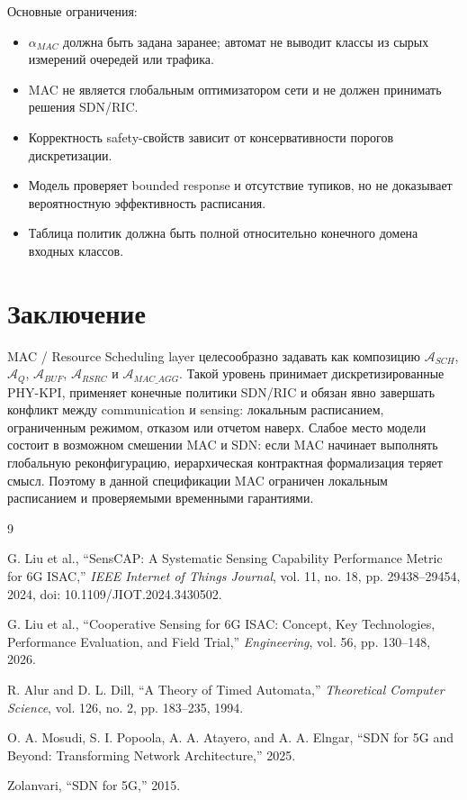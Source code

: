 \documentclass[10pt,a4paper]{article}
\newcommand{\A}[1]{\mathcal{A}_{#1}}
\begin{document}
Основные ограничения:
\begin{itemize}
  \item \(\alpha_{MAC}\) должна быть задана заранее; автомат не выводит классы из сырых измерений очередей или трафика.
  \item MAC не является глобальным оптимизатором сети и не должен принимать решения SDN/RIC.
  \item Корректность safety-свойств зависит от консервативности порогов дискретизации.
  \item Модель проверяет bounded response и отсутствие тупиков, но не доказывает вероятностную эффективность расписания.
  \item Таблица политик должна быть полной относительно конечного домена входных классов.
\end{itemize}

\section{Заключение}

MAC / Resource Scheduling layer целесообразно задавать как композицию \(\A{SCH}\), \(\A{Q}\), \(\A{BUF}\), \(\A{RSRC}\) и \(\A{MAC\_AGG}\). Такой уровень принимает дискретизированные PHY-KPI, применяет конечные политики SDN/RIC и обязан явно завершать конфликт между communication и sensing: локальным расписанием, ограниченным режимом, отказом или отчетом наверх. Слабое место модели состоит в возможном смешении MAC и SDN: если MAC начинает выполнять глобальную реконфигурацию, иерархическая контрактная формализация теряет смысл. Поэтому в данной спецификации MAC ограничен локальным расписанием и проверяемыми временными гарантиями.

\begin{thebibliography}{9}

G. Liu et al., ``SensCAP: A Systematic Sensing Capability Performance Metric for 6G ISAC,'' \emph{IEEE Internet of Things Journal}, vol. 11, no. 18, pp. 29438--29454, 2024, doi: 10.1109/JIOT.2024.3430502.

G. Liu et al., ``Cooperative Sensing for 6G ISAC: Concept, Key Technologies, Performance Evaluation, and Field Trial,'' \emph{Engineering}, vol. 56, pp. 130--148, 2026.

R. Alur and D. L. Dill, ``A Theory of Timed Automata,'' \emph{Theoretical Computer Science}, vol. 126, no. 2, pp. 183--235, 1994.

O. A. Mosudi, S. I. Popoola, A. A. Atayero, and A. A. Elngar, ``SDN for 5G and Beyond: Transforming Network Architecture,'' 2025.

Zolanvari, ``SDN for 5G,'' 2015.

\end{thebibliography}
\end{document}
